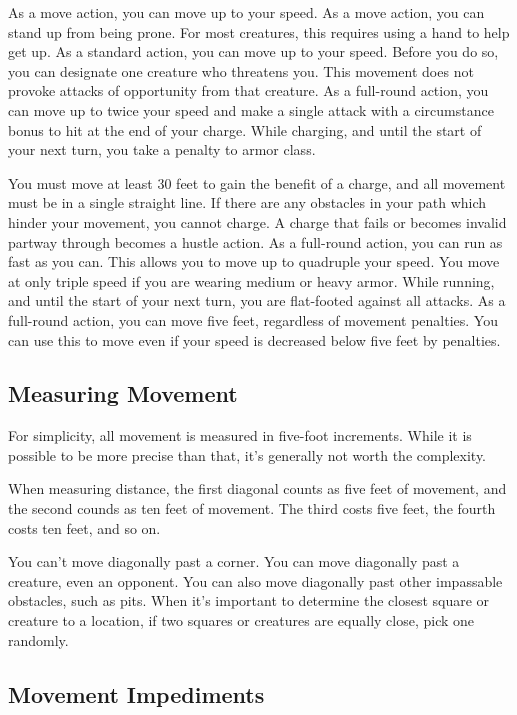  As a move action, you can move up to your speed.
 As a move action, you can stand up from being prone. For most creatures, this requires using a hand to help get up.
 As a standard action, you can move up to your speed. Before you do so, you can designate one creature who threatens you. This movement does not provoke attacks of opportunity from that creature.
 As a full-round action, you can move up to twice your speed and make a single attack with a  circumstance bonus to hit at the end of your charge. While charging, and until the start of your next turn, you take a  penalty to armor class.
\par You must move at least 30 feet to gain the benefit of a charge, and all movement must be in a single straight line. If there are any obstacles in your path which hinder your movement, you cannot charge. A charge that fails or becomes invalid partway through becomes a hustle action.
 As a full-round action, you can run as fast as you can. This allows you to move up to quadruple your speed. You move at only triple speed if you are wearing medium or heavy armor. While running, and until the start of your next turn, you are flat-footed against all attacks.
 As a full-round action, you can move five feet, regardless of movement penalties. You can use this to move even if your speed is decreased below five feet by penalties.

\subsection{Measuring Movement}
For simplicity, all movement is measured in five-foot increments. While it is possible to be more precise than that, it's generally not worth the complexity.

 When measuring distance, the first diagonal counts as five feet of movement, and the second counds as ten feet of movement. The third costs five feet, the fourth costs ten feet, and so on.

You can't move diagonally past a corner. You can move diagonally past a creature, even an opponent. You can also move diagonally past other impassable obstacles, such as pits.
 When it's important to determine the closest square or creature to a location, if two squares or creatures are equally close, pick one randomly.

\subsection{Movement Impediments}

